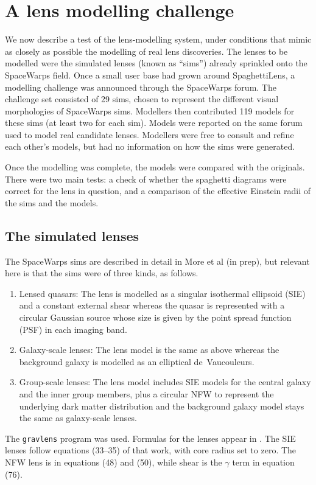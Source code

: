 \documentclass[usenatbib]{mn2e}
\newcommand{\spl}{SpaghettiLens\xspace}
\newcommand{\sw}{SpaceWarps\xspace}
\begin{document}

\section{A lens modelling challenge} \label{sec:mod_challenge}

We now describe a test of the lens-modelling system, under conditions
that mimic as closely as possible the modelling of real lens
discoveries.  The lenses to be modelled were the simulated lenses
(known as ``sims'') already sprinkled onto the \sw field.  Once a
small user base had grown around \spl, a modelling challenge was
announced through the \sw forum.  The challenge set consisted of 29
sims, chosen to represent the different visual morphologies of \sw
sims. Modellers then contributed 119 models for these sims (at least
two for each sim).  Models were reported on the same forum used to
model real candidate lenses.  Modellers were free to consult and
refine each other's models, but had no information on how the sims
were generated.

Once the modelling was complete, the models were compared with the
originals.  There were two main tests: a check of whether the
spaghetti diagrams were correct for the lens in question, and a
comparison of the effective Einstein radii of the sims and the models.



\subsection{The simulated lenses} \label{sec:sims}

The \sw sims are described in detail in More et al (in prep), but
relevant here is that the sims were of three kinds, as follows.
\begin{enumerate}
\item Lensed quasars: The lens is modelled as a singular isothermal
  ellipsoid (SIE) and a constant external shear whereas the quasar is
  represented with a circular Gaussian source whose size is given by
  the point spread function (PSF) in each imaging band.
\item Galaxy-scale lenses: The lens model is the same as above whereas
  the background galaxy is modelled as an elliptical de~Vaucouleurs.
\item Group-scale lenses: The lens model includes SIE models for the
  central galaxy and the inner group members, plus a circular NFW
  \citep{1996ApJ...462..563N,1997ApJ...490..493N} to represent the
  underlying dark matter distribution and the background galaxy model
  stays the same as galaxy-scale lenses.
\end{enumerate}
The {\tt gravlens} program \citep{2001astro.ph..2340K} was used.
Formulas for the lenses appear in \cite{2001astro.ph..2341K}. The SIE
lenses follow equations (33--35) of that work, with core radius set to
zero.  The NFW lens is in equations (48) and (50), while shear is the
$\gamma$ term in equation (76).
\end{document}
